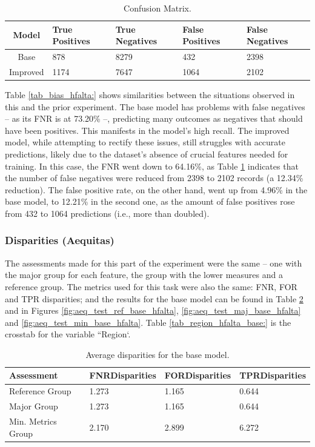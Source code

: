 \documentclass[twoside,11pt]{article}
\begin{document}
\begin{table}[!htb]
\centering
\begin{tabular}{|c|p{3cm}|p{3cm}|p{3cm}|p{3cm}|}
        \hline
        \textbf{Model} & \textbf{True Positives} & \textbf{True Negatives} & \textbf{False Positives} & \textbf{False Negatives}\\ \hline
        Base & 878 & 8279 & 432 & 2398  \\ 
        Improved & 1174 & 7647 & 1064 & 2102  \\ 
        \hline
    \end{tabular}
\caption{Confusion Matrix.}
\label{tab_cm_hfalta:}
\end{table}

Table \ref{tab_bias_hfalta:} shows similarities between the situations observed in this and the prior experiment. The base model has problems with false negatives -- as its FNR is at 73.20\% --, predicting many outcomes as negatives that should have been positives. This manifests in the model's high recall. The improved model, while attempting to rectify these issues, still struggles with accurate predictions, likely due to the dataset's absence of crucial features needed for training. In this case, the FNR went down to 64.16\%, as Table \ref{tab_cm_hfalta:} indicates that the number of false negatives were reduced from 2398 to 2102 records (a 12.34\% reduction). The false positive rate, on the other hand, went up from 4.96\% in the base model, to 12.21\% in the second one, as the amount of false positives rose from 432 to 1064 predictions (i.e., more than doubled). 

\subsubsection{Disparities (Aequitas)}

The assessments made for this part of the experiment were the same -- one with the major group for each feature, the group with the lower measures and a reference group. The metrics used for this task were also the same: FNR, FOR and TPR disparities; and the results for the base model can be found in Table \ref{tab_asses_base_hfalta:} and in Figures \ref{fig:aeq_test_ref_base_hfalta}, \ref{fig:aeq_test_maj_base_hfalta} and \ref{fig:aeq_test_min_base_hfalta}. Table \ref{tab_region_hfalta_base:} is the crosstab for the variable ``Region`.

\begin{table}[!htb]
\centering
\begin{tabular}{|p{70pt}|p{2cm}|p{2cm}|p{2cm}|}
\hline
        \textbf{Assessment} & \textbf{FNR\break Disparities} & \textbf{FOR\break Disparities} & \textbf{TPR\break Disparities} \\ \hline
        Reference Group & 1.273 & 1.165 & 0.644   \\
        Major Group & 1.273 & 1.165 & 0.644 \\ 
        Min. Metrics Group & 2.170 & 2.899 & 6.272 \\ 
        \hline
    \end{tabular}
\caption{Average disparities for the base model.}
\label{tab_asses_base_hfalta:}
\end{table}
\end{document}
